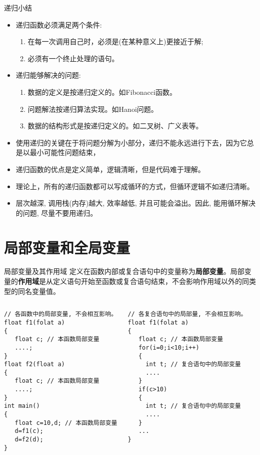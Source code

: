 \begin{frame}{递归小结}
\begin{itemize}
	\item 递归函数必须满足两个条件:
	\begin{enumerate}
		\item 在每一次调用自己时，必须是(在某种意义上)更接近于解;
		\item 必须有一个终止处理的语句。
	\end{enumerate}
    \item 递归能够解决的问题:
    \begin{enumerate}
    	\item 数据的定义是按递归定义的。如Fibonacci函数。
    	\item 问题解法按递归算法实现。如Hanoi问题。
    	\item 数据的结构形式是按递归定义的。如二叉树、广义表等。
    \end{enumerate}
	\item 使用递归的关键在于将问题分解为小部分，递归不能永远进行下去，因为它总是以最小可能性问题结束，
	\item 递归函数的优点是定义简单，逻辑清晰，但是代码难于理解。
	\item 理论上，所有的递归函数都可以写成循环的方式，但循环逻辑不如递归清晰。
	\item 层次越深, 调用栈(内存)越大, 效率越低, 并且可能会溢出。因此, 能用循环解决的问题, 尽量不要用递归。
\end{itemize}
\end{frame}

\section{局部变量和全局变量}

\begin{frame}{局部变量及其作用域}
定义在函数内部或复合语句中的变量称为\textbf{局部变量}。局部变量的\textbf{作用域}是从定义语句开始至函数或复合语句结束，不会影响作用域以外的同类型的同名变量值。 
\begin{columns}[T]
\begin{lstlisting}
// 各函数中的局部变量, 不会相互影响。
float f1(folat a) 
{
   float c; // 本函数局部变量
   ....;
}
float f2(float a)
{ 
   float c; // 本函数局部变量
   ....;
}
int main()
{
   float c=10,d; // 本函数局部变量
   d=f1(c);
   d=f2(d);
}
\end{lstlisting}
\begin{lstlisting}[frame=leftline]
// 各复合语句中的局部量, 不会相互影响。
float f1(folat a) 
{
   float c; // 本函数局部变量
   for(i=0;i<10;i++) 
   {
     int t; // 复合语句中的局部变量 
     ....
   }
   if(c>10)
   {
     int t; // 复合语句中的局部变量 
     ....
   }
   ...
}
\end{lstlisting}
\end{columns}
~\\
\end{frame}

